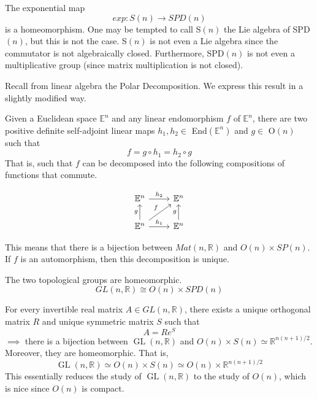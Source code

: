 \documentclass{article}
\DeclareMathOperator{\GL}{GL}
\begin{document}
    \begin{lemma}
      The exponential map 
      \begin{equation}
        exp: S(n) \longrightarrow SPD(n)
      \end{equation}
      is a homeomorphism. One may be tempted to call S$(n)$ the Lie algebra of SPD$(n)$, but this is not the case. S$(n)$ is not even a Lie algebra since the commutator is not algebraically closed. Furthermore, SPD$(n)$ is not even a multiplicative group (since matrix multiplication is not closed). 
    \end{lemma}

    Recall from linear algebra the Polar Decomposition. We express this result in a slightly modified way. 

    \begin{theorem}
      Given a Euclidean space $\mathbb{E}^n$ and any linear endomorphism $f$ of $\mathbb{E}^n$, there are two positive definite self-adjoint linear maps $h_1, h_2 \in$ End$(\mathbb{E}^n)$ and $g \in$ O$(n)$ such that
      \begin{equation}
        f = g \circ h_1 = h_2 \circ g
      \end{equation}
      That is, such that $f$ can be decomposed into the following compositions of functions that commute. 

      \[\begin{tikzcd}
      \mathbb{E}^n \arrow{r}{h_2} & \mathbb{E}^n \\
      \mathbb{E}^n \arrow{u}{g} \arrow{ur}{f} \arrow{r}{h_1} & \mathbb{E}^n \arrow{u}{g}
      \end{tikzcd}\]

      This means that there is a bijection between $Mat(n, \mathbb{R})$ and $O(n) \times SP(n)$. If $f$ is an automorphism, then this decomposition is unique. 
    \end{theorem}

    \begin{corollary}
      The two topological groups are homeomorphic. 
      \begin{equation}
        GL(n, \mathbb{R}) \cong O(n) \times SPD(n)
      \end{equation}
    \end{corollary}

    \begin{corollary}
      For every invertible real matrix $A \in GL(n, \mathbb{R})$, there exists a unique orthogonal matrix $R$ and unique symmetric matrix $S$ such that
      \begin{equation}
        A = R e^S
      \end{equation}
      $\implies$ there is a bijection between $\GL(n, \mathbb{R})$ and $O(n) \times S(n) \simeq \mathbb{R}^{n(n+1)/2}$. Moreover, they are homeomorphic. That is, 
      \begin{equation}
        \GL(n, \mathbb{R}) \simeq O(n) \times S(n) \simeq O(n) \times \mathbb{R}^{n(n+1)/2}
      \end{equation}
      This essentially reduces the study of $\GL(n, \mathbb{R})$ to the study of $O(n)$, which is nice since $O(n)$ is compact. 
    \end{corollary}
\end{document}
